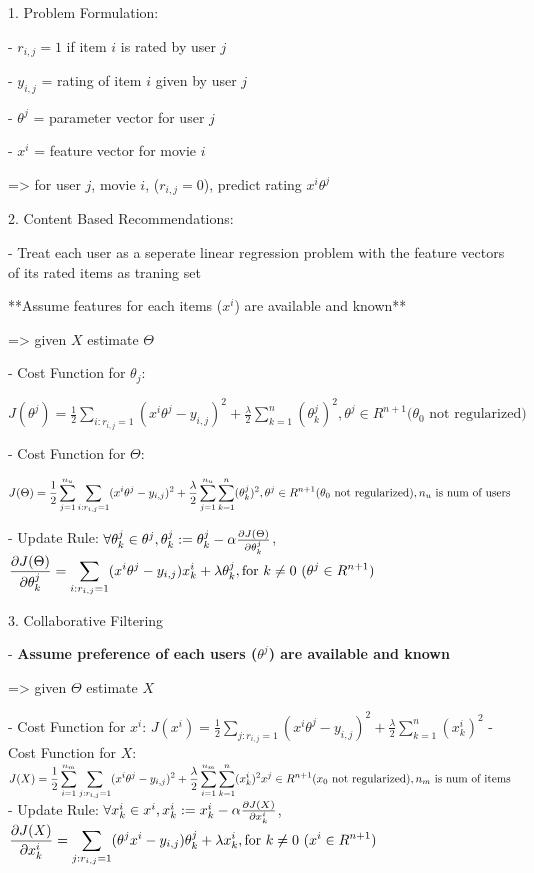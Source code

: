 1. Problem Formulation:

- $r_{i,j}=1$ if item $i$ is rated by user $j$ 

- $y_{i,j}$ = rating of item $i$ given by user $j$ 

- $\theta^j$ = parameter vector for user $j$ 

- $x^i$ = feature vector for movie $i$ 

=> for user $j$, movie $i$, ($r_{i,j}=0$), predict rating $x^i\theta^j$

2. Content Based Recommendations:

- Treat each user as a seperate linear regression problem with the feature vectors of its rated items as traning set

**Assume features for each items ($x^i$) are available and known**

=> given $X$ estimate $\Theta$ 

- Cost Function for $\theta_j$: 

$\displaystyle J(\theta^j)= \frac1 {2} \sum_{i:r_{i,j}=1}(x^i\theta^j-y_{i,j})^2+\frac \lambda {2} \sum_{k=1}^n(\theta^j_k)^2, \theta^j \in R^{n+1} (\theta_0 \text{ not regularized)}$

- Cost Function for $\Theta$:

$\displaystyle J(\Theta)= \frac1{2} \sum_{j=1}^{n_u} \sum_{i:r_{i,j}=1}(x^i\theta^j-y_{i,j})^2+\frac \lambda {2} \sum_{j=1}^{n_u} \sum_{k=1}^n(\theta^j_k)^2, \\ \theta^j \in R^{n+1} (\theta_0 \text{ not regularized)}, \space n_u \text{ is num of users}$ 

- Update Rule: \(\forall \theta^j_k \in \theta^j, \theta^j_k := \theta^j_k-\alpha\large\frac{\partial J(\Theta)}{\partial\theta^j_k}\), \(\displaystyle \frac{\partial J(\Theta)}{\partial\theta^j_k}=\sum_{i:r_{i,j}=1}(x^i\theta^j-y_{i,j})x_k^i+ \lambda \theta_k^j, \space \text{for $k \neq 0$ ($\theta^j \in R^{n+1}$)}\) 

3. Collaborative Filtering

- \textbf{Assume preference of each users ($\theta^j$) are available and known}

=> given $\Theta$ estimate $X$ 

- Cost Function for $x^i$: $\displaystyle J(x^i)=\frac 1 2 \sum_{j:r_{i,j}=1} (x^i\theta^j - y_{i,j})^2 + \frac \lambda 2 \sum ^n_{k=1} (x_k^i)^2$ 
- Cost Function for $X$: $\displaystyle J(X)=\frac 1 2 \sum_{i=1}^{n_m} \sum_{j:r_{i,j}=1} (x^i\theta^j - y_{i,j})^2 + \frac \lambda 2 \sum_{i=1}^{n_m} \sum ^n_{k=1} (x_k^i)^2 \\ x^j \in R^{n+1} (x_0 \text{ not regularized)}, \space n_m \text{ is num of items}$ 
- Update Rule: \(\forall x^i_k \in x^i, x^i_k := x^i_k-\alpha\large\frac{\partial J(X)}{\partial x^i_k}\), \(\displaystyle \frac{\partial J(X)}{\partial x^i_k}=\sum_{j:r_{i,j}=1}(\theta^jx^i-y_{i,j})\theta_k^j+ \lambda x_k^i, \space \text{for $k \neq 0$ $(x^i \in R^{n+1}$)}\)

